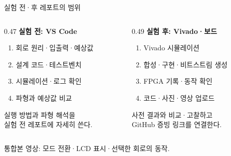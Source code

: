 \begin{frame}[label=lab1-reports]{실험 전·후 레포트의 범위}
\small
\begin{columns}[T,onlytextwidth]
  \begin{column}{0.47\textwidth}
    {\color{UOSBlue}\large\bfseries 실험 전: VS Code}\par\vspace{0.22cm}
    \begin{enumerate}
      \setlength{\itemsep}{0.16cm}
      \item 회로 원리·입출력·예상값
      \item 설계 코드·테스트벤치
      \item 시뮬레이션·로그 확인
      \item 파형과 예상값 비교
    \end{enumerate}
    \vspace{0.23cm}
    {\small 실행 방법과 파형 해석을\\실험 전 레포트에 자세히 쓴다.}
  \end{column}
  \begin{column}{0.49\textwidth}
    {\color{UOSBlue}\large\bfseries 실험 후: Vivado·보드}\par\vspace{0.22cm}
    \begin{enumerate}
      \setlength{\itemsep}{0.16cm}
      \item Vivado 시뮬레이션
      \item 합성·구현·비트스트림 생성
      \item FPGA 기록·동작 확인
      \item 코드·사진·영상 업로드
    \end{enumerate}
    \vspace{0.23cm}
    {\small 사전 결과와 비교·고찰하고\\GitHub 증빙 링크를 연결한다.}
  \end{column}
\end{columns}
\vspace{0.38cm}
{\small 통합본 영상: 모드 전환·LCD 표시·선택한 회로의 동작.}
\end{frame}
